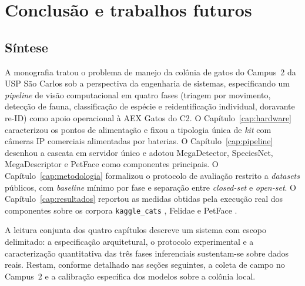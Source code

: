 \chapter{Conclusão e trabalhos futuros}
\label{cap:conclusao}


\section{Síntese}
\label{sec:conclusao-sintese}

A monografia tratou o problema de manejo da colônia de gatos do Campus~2 da USP São Carlos sob a perspectiva da engenharia de sistemas, especificando um \textit{pipeline} de visão computacional em quatro fases (triagem por movimento, detecção de fauna, classificação de espécie e reidentificação individual, doravante re-ID) como apoio operacional à AEX Gatos do C2. O Capítulo~\ref{cap:hardware} caracterizou os pontos de alimentação e fixou a tipologia única de \textit{kit} com câmeras IP comerciais alimentadas por baterias. O Capítulo~\ref{cap:pipeline} desenhou a cascata em servidor único e adotou MegaDetector, SpeciesNet, MegaDescriptor e PetFace como componentes principais. O Capítulo~\ref{cap:metodologia} formalizou o protocolo de avaliação restrito a \textit{datasets} públicos, com \textit{baseline} mínimo por fase e separação entre \textit{closed-set} e \textit{open-set}. O Capítulo~\ref{cap:resultados} reportou as medidas obtidas pela execução real dos componentes sobre os corpora \texttt{kaggle\_cats} , Felidae  e PetFace .

A leitura conjunta dos quatro capítulos descreve um sistema com escopo delimitado: a especificação arquitetural, o protocolo experimental e a caracterização quantitativa das três fases inferenciais sustentam-se sobre dados reais. Restam, conforme detalhado nas seções seguintes, a coleta de campo no Campus~2 e a calibração específica dos modelos sobre a colônia local.



